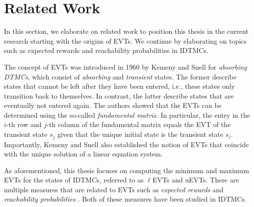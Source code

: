




\section{Related Work}\label{sec:related-work}
In this section, we elaborate on related work to position this thesis in the current research starting with the origins of EVTs. We continue by elaborating on topics such as expected rewards and reachability probabilities in IDTMCs.

The concept of EVTs was introduced in 1960 by Kemeny and Snell \cite{KemenySnellBook} for \textit{absorbing DTMCs}, which consist of \textit{absorbing} and \textit{transient} states. The former describe states that cannot be left after they have been entered, i.e., these states only transition back to themselves. In contrast, the latter describe states that are eventually not entered again. The authors showed that the EVTs can be determined using the so-called \textit{fundamental matrix}. In particular, the entry in the $i$-th row and $j$-th column of the fundamental matrix equals the EVT of the transient state $s_j$ given that the unique initial state is the transient state $s_i$. Importantly, Kemeny and Snell also established the notion of EVTs that coincide with the unique solution of a linear equation system.


As aforementioned, this thesis focuses on computing the minimum and maximum EVTs for the states of IDTMCs, referred to as $\ell$EVTs and uEVTs. There are multiple measures that are related to EVTs such as \textit{expected rewards} \cite{Computing_EVTs_Stationary_Distr_in_MCs_Mertens} and \textit{reachability probabilities} \cite{Baier_Relating_Reach_Prob,Computing_EVTs_Stationary_Distr_in_MCs_Mertens}. Both of these measures have been studied in IDTMCs.

